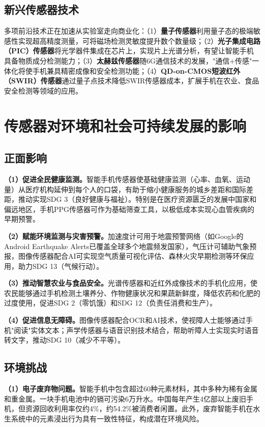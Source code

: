 \documentclass[12pt, a4paper]{ctexart}
\begin{document}
\subsection{新兴传感器技术}

多项前沿技术正在加速从实验室走向商业化\cite{innosensor2025,gansuan2025}：（1）\textbf{量子传感器}利用量子态的极端敏感性实现超高精度测量，可将磁场检测灵敏度提升数个数量级；（2）\textbf{光子集成电路（PIC）传感器}将光学器件集成在芯片上，实现片上光谱分析，有望让智能手机具备物质成分检测能力；（3）\textbf{太赫兹传感器}随6G通信技术的发展，"通信+传感"一体化将使手机兼具精密成像和安全检测功能；（4）\textbf{QD-on-CMOS短波红外（SWIR）传感器}通过量子点技术降低SWIR传感器成本，扩展手机在农业、食品安全检测等领域的应用。


\section{传感器对环境和社会可持续发展的影响}

\subsection{正面影响}

\textbf{（1）促进全民健康监测。}智能手机传感器使基础健康监测（心率、血氧、运动量）从医疗机构延伸到每个人的口袋，有助于缩小健康服务的城乡差距和国际差距，推动实现SDG 3（良好健康与福祉）。特别是在医疗资源匮乏的发展中国家和偏远地区，手机PPG传感器可作为基础筛查工具，以极低成本实现心血管疾病的早期预警。

\textbf{（2）赋能环境监测与灾害预警。}加速度计可用于地震预警网络（如Google的Android Earthquake Alerts已覆盖全球多个地震频发国家），气压计可辅助气象预报，图像传感器配合AI可实现空气质量可视化评估、森林火灾早期检测等环保应用，助力SDG 13（气候行动）。

\textbf{（3）推动智慧农业与食品安全。}光谱传感器和近红外成像技术的手机化应用，使农民能够通过手机检测土壤养分、作物健康状况和果蔬新鲜度，降低农药和化肥的过度使用，促进SDG 2（零饥饿）和SDG 12（负责任消费和生产）。

\textbf{（4）促进信息无障碍。}图像传感器配合OCR和AI技术，使视障人士能够通过手机"阅读"实体文本；声学传感器与语音识别技术结合，帮助听障人士实现实时语音转文字，推动SDG 10（减少不平等）。

\subsection{环境挑战}

\textbf{（1）电子废弃物问题。}智能手机中包含超过60种元素材料\cite{stcn2025}，其中多种为稀有金属和重金属。一块手机电池中的镉可污染6万升水\cite{ndrc2022}。中国每年产生4亿部以上废旧手机，但资源回收利用率仅约4\%，约54.2\%被消费者闲置\cite{stcn2025}。此外，废弃智能手机在水生系统中的元素浸出行为具有一致性特征，构成潜在环境风险\cite{ebiotrade2025}。
\end{document}
